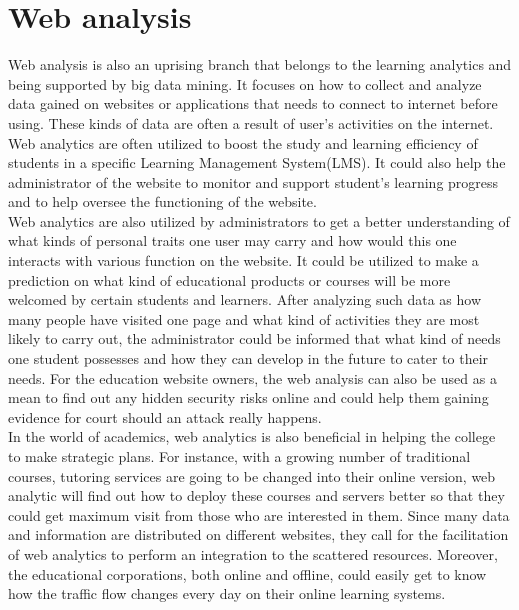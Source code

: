 \documentclass[sigconf]{acmart}
\begin{document}
\section{Web analysis} 
Web analysis is also an uprising branch that belongs to the learning analytics and being supported by big data mining. It focuses on how to collect and analyze data gained on websites or applications that needs to connect to internet before using. These kinds of data are often a result of user's activities on the internet. Web analytics are often utilized to boost the study and learning efficiency of students in a specific Learning Management System(LMS). It could also help the administrator of the website to monitor and support student's learning progress and to help oversee the functioning of the website\cite{Krawiec2017}.\\
Web analytics are also utilized by administrators to get a better understanding of what kinds of personal traits one user may carry and how would this one interacts with various function on the website. It could be utilized to make a prediction on what kind of educational products or courses will be more welcomed by certain students and learners. After analyzing such data as how many people have visited one page and what kind of activities they are most likely to carry out, the administrator could be informed that what kind of needs one student possesses and how they can develop in the future to cater to their needs. For the education website owners, the web analysis can also be used as a mean to find out any hidden security risks online and could help them gaining evidence for court should an attack really happens. \\
In the world of academics, web analytics is also beneficial in helping the college to make strategic plans. For instance, with a growing number of traditional courses, tutoring services are going to be changed into their online version, web analytic will find out how to deploy these courses and servers better so that they could get maximum visit from those who are interested in them. Since many data and information are distributed on different websites, they call for the facilitation of web analytics to perform an integration to the scattered resources. Moreover, the educational corporations, both online and offline, could easily get to know how the traffic flow changes every day on their online learning systems\cite{Aher2013}.\\
\end{document}
